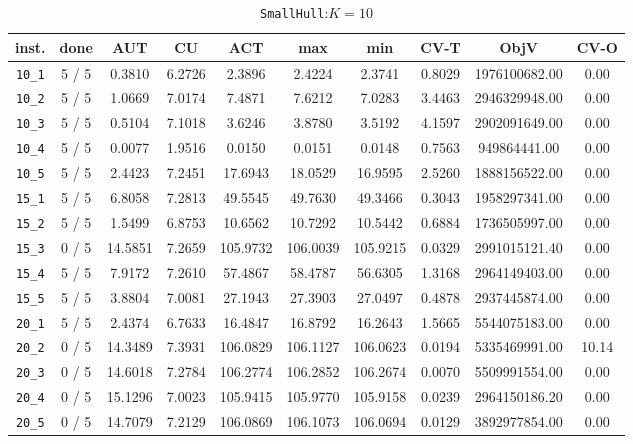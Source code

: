 
\begin{table}[h!]
\begin{center}
\small
\begin{tabular}{| c | c | c | c | c | c | c | c | c | c |}
\hline
inst. & done & AUT & CU & ACT & max & min & CV-T & ObjV & CV-O \\
\hline
\verb|10_1| & 5 / 5 & 0.3810 & 6.2726 & 2.3896 & 2.4224 & 2.3741 & 0.8029 & 1976100682.00 & 0.00\\ 
\verb|10_2| & 5 / 5 & 1.0669 & 7.0174 & 7.4871 & 7.6212 & 7.0283 & 3.4463 & 2946329948.00 & 0.00\\ 
\verb|10_3| & 5 / 5 & 0.5104 & 7.1018 & 3.6246 & 3.8780 & 3.5192 & 4.1597 & 2902091649.00 & 0.00\\ 
\verb|10_4| & 5 / 5 & 0.0077 & 1.9516 & 0.0150 & 0.0151 & 0.0148 & 0.7563 & 949864441.00 & 0.00\\ 
\verb|10_5| & 5 / 5 & 2.4423 & 7.2451 & 17.6943 & 18.0529 & 16.9595 & 2.5260 & 1888156522.00 & 0.00\\ 
\verb|15_1| & 5 / 5 & 6.8058 & 7.2813 & 49.5545 & 49.7630 & 49.3466 & 0.3043 & 1958297341.00 & 0.00\\ 
\verb|15_2| & 5 / 5 & 1.5499 & 6.8753 & 10.6562 & 10.7292 & 10.5442 & 0.6884 & 1736505997.00 & 0.00\\ 
\verb|15_3| & 0 / 5 & 14.5851 & 7.2659 & 105.9732 & 106.0039 & 105.9215 & 0.0329 & 2991015121.40 & 0.00\\ 
\verb|15_4| & 5 / 5 & 7.9172 & 7.2610 & 57.4867 & 58.4787 & 56.6305 & 1.3168 & 2964149403.00 & 0.00\\ 
\verb|15_5| & 5 / 5 & 3.8804 & 7.0081 & 27.1943 & 27.3903 & 27.0497 & 0.4878 & 2937445874.00 & 0.00\\ 
\verb|20_1| & 5 / 5 & 2.4374 & 6.7633 & 16.4847 & 16.8792 & 16.2643 & 1.5665 & 5544075183.00 & 0.00\\ 
\verb|20_2| & 0 / 5 & 14.3489 & 7.3931 & 106.0829 & 106.1127 & 106.0623 & 0.0194 & 5335469991.00 & 10.14\\ 
\verb|20_3| & 0 / 5 & 14.6018 & 7.2784 & 106.2774 & 106.2852 & 106.2674 & 0.0070 & 5509991554.00 & 0.00\\ 
\verb|20_4| & 0 / 5 & 15.1296 & 7.0023 & 105.9415 & 105.9770 & 105.9158 & 0.0239 & 2964150186.20 & 0.00\\ 
\verb|20_5| & 0 / 5 & 14.7079 & 7.2129 & 106.0869 & 106.1073 & 106.0694 & 0.0129 & 3892977854.00 & 0.00\\ 
\hline
\end{tabular}
\caption{\texttt{SmallHull}:$K=10$}
\label{table:hull:10}
\end{center}
\end{table}


